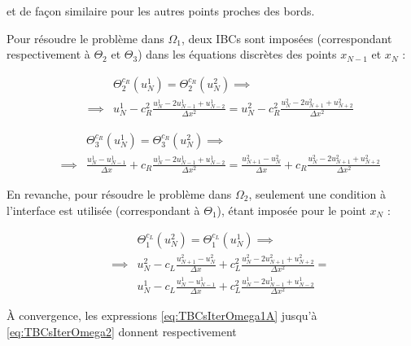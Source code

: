 \noindent et de façon similaire pour les autres points proches des bords.

\indent Pour résoudre le problème dans $\Omega_1$, deux IBCs sont imposées (correspondant respectivement à $\Theta_2$ et $\Theta_3$) dans les équations discrètes des points $x_{N-1}$ et $x_N$ : 

\begin{equation}
	\begin{aligned}
    \label{eq:TBCsIterOmega1A}
    && 				&\Theta_2^{c_R}(u_N^1) = \Theta_2^{c_R}(u_N^2) \implies \\ 
    && \implies & u_N^1 - c_R^2 \frac{u_N^1 - 2u_{N-1}^1 + u_{N-2}^1}{\Delta x^2} = u_N^2 - c_R^2 \frac{u_N^2 - 2u_{N+1}^2 + u_{N+2}^2}{\Delta x^2} 
    \end{aligned}
\end{equation}

\begin{equation}
	\begin{aligned}
    \label{eq:TBCsIterOmega1B}
    && 			   & \Theta_3^{c_R}(u_N^1) = \Theta_3^{c_R}(u_N^2) \implies \\
    && \implies & \frac{u_N^1 - u_{N-1}^1}{\Delta x} + c_R \frac{u_N^1 - 2u_{N-1}^1 + u_{N-2}^1}{\Delta x^2} = \frac{u_{N+1}^2 - u_{N}^2}{\Delta x} + c_R \frac{u_N^2 - 2u_{N+1}^2 + u_{N+2}^2}{\Delta x^2}
    \end{aligned}
\end{equation}

\indent En revanche, pour résoudre le problème dans $\Omega_2$, seulement une condition à l'interface est utilisée (correspondant à $\Theta_1$), étant imposée pour le point $x_N$ : 

\begin{equation}
	\begin{aligned}
    \label{eq:TBCsIterOmega2}
    && 				&\Theta_1^{c_L}(u_N^2) = \Theta_1^{c_L}(u_N^1) \implies \\ 
    && \implies & u_N^2 - c_L \frac{u_{N+1}^2 - u_{N}^2}{\Delta x} + c_L^2 \frac{u_N^2 - 2u_{N+1}^2 + u_{N+2}^2}{\Delta x^2}  =\\
    && 				& u_N^1 - c_L \frac{u_{N}^1 - u_{N-1}^1}{\Delta x} + c_L^2 \frac{u_N^1 - 2u_{N-1}^1 + u_{N-2}^1}{\Delta x^2}
    \end{aligned}
\end{equation}

\indent À convergence, les expressions \eqref{eq:TBCsIterOmega1A} jusqu'à \eqref{eq:TBCsIterOmega2} donnent respectivement 


